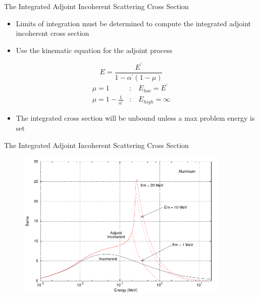 \documentclass{beamer}
\begin{document}
\begin{frame}{The Integrated Adjoint Incoherent Scattering Cross Section}

  \begin{itemize}
    \item Limits of integration must be determined to compute the 
      integrated adjoint incoherent cross section
      \medskip
    \item Use the kinematic equation for the adjoint process
  \end{itemize}
  \begin{equation*}
    E = \frac{E^{'}}{1-\alpha^{'}(1-\mu)}
  \end{equation*}
  \begin{align}
    \mu = 1&\text{:} \quad E_{low} = E^{'} \nonumber \\
    \mu = 1 - \frac{1}{\alpha^{'}}&\text{:} \quad E_{high} = \infty \nonumber
  \end{align}
        
  \begin{itemize}
    \item The integrated cross section will be unbound unless a max problem 
      energy is set
  \end{itemize}
  
\end{frame}

\begin{frame}{The Integrated Adjoint Incoherent Scattering Cross Section}

  \begin{figure}[h!]
    \begin{center}
      \includegraphics[width=4.0in]{figures/adjoint_and_forward_incoherent_cross_section-13.pdf}
    \end{center}
  \end{figure}

\end{frame}
\end{document}
